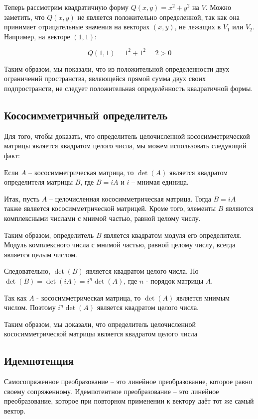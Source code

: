 Теперь рассмотрим квадратичную форму $Q(x,y) = x^2 + y^2$ на $V$.
Можно заметить, что $Q(x,y)$ не является положительно определенной, так как она принимает отрицательные значения на
векторах $(x,y)$, не лежащих в $V_1$ или $V_2$.
Например, на векторе $(1,1)$:

\[ Q(1,1) = 1^2 + 1^2 = 2 > 0 \]

Таким образом, мы показали, что из положительной определенности двух ограничений пространства, являющейся прямой
сумма двух своих подпространств, не следует положительная определённость квадратичной формы.

 \subsection*{Кососимметричный определитель}

Для того, чтобы доказать, что определитель целочисленной кососимметрической матрицы является квадратом целого числа,
мы можем использовать следующий факт:

Если $A$ -- кососимметрическая матрица, то $\det(A)$ является квадратом определителя матрицы $B$, где $B = iA$ и $i$
-- мнимая единица.

Итак, пусть $A$ -- целочисленная кососимметрическая матрица.
Тогда $B=iA$ также является кососимметрической матрицей.
Кроме того, элементы $B$ являются комплексными числами с мнимой частью, равной целому числу.

Таким образом, определитель $B$ является квадратом модуля его определителя.
Модуль комплексного числа с мнимой частью, равной целому числу, всегда является целым числом.

Следовательно, $\det(B)$ является квадратом целого числа.
Но $\det(B) = \det(iA) = i^n \det(A)$, где $n$ - порядок матрицы $A$.

Так как $A$ - кососимметрическая матрица, то $\det(A)$ является мнимым числом.
Поэтому $i^n\det(A)$ является квадратом целого числа.

Таким образом, мы доказали, что определитель целочисленной кососимметрической матрицы является квадратом целого числа

 \subsection*{Идемпотенция}

Самосопряженное преобразование -- это линейное преобразование, которое равно своему сопряженному.
Идемпотентное преобразование -- это линейное преобразование, которое при повторном применении к вектору даёт тот же
самый вектор.

